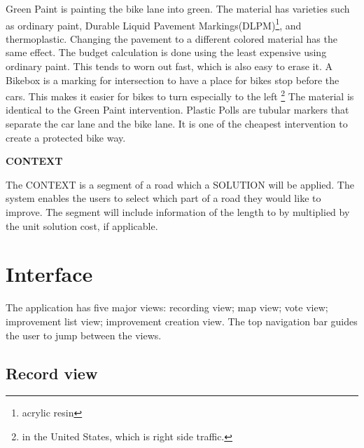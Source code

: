 Green Paint is painting the bike lane into green. The material has varieties such as ordinary paint, Durable Liquid Pavement Markings(DLPM)\footnote{acrylic resin}, and thermoplastic. Changing the pavement to a different colored material has the same effect. The budget calculation is done using the least expensive using ordinary paint. This tends to worn out fast, which is also easy to erase it.\cite{national2014urban} A Bikebox is a marking for intersection to have a place for bikes stop before the cars. This makes it easier for bikes to turn especially to the left \footnote{in the United States, which is right side traffic.} The material is identical to the Green Paint intervention. Plastic Polls are tubular markers that separate the car lane and the bike lane. It is one of the cheapest intervention to create a protected bike way. 

\textbf{CONTEXT}

The CONTEXT is a segment of a road which a SOLUTION will be applied. The system enables the users to select which part of a road they would like to improve. The segment will include information of the length to by multiplied by the unit solution cost, if applicable.


\section{Interface}

The application has five major views: recording view; map view; vote view; improvement list view; improvement creation view.
The top navigation bar guides the user to jump between the views.


\subsection{Record view}

